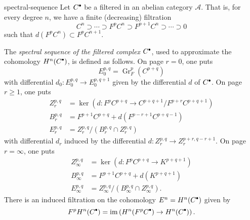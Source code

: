 \begin{example}{spectral-sequence}
    Let $C^\bdot$ be a filtered  in an abelian category $\mathcal{A}$. That is, for every degree $n$, we have a finite (decreasing) filtration
    \[ C^n \supset \cdots \supset F^p C^n \supset F^{p + 1} C^n \supset \cdots \supset 0 \]
    such that $d(F^p C^n) \subset F^p C^{n + 1}$.

    The \textit{spectral sequence of the filtered complex} $C^\bdot$, used to approximate the cohomology $H^n(C^\bdot)$, is defined as follows. On page $r = 0$, one puts
    \[ E_0^{p, q} = \operatorname{Gr}_F^p(C^{p + q}) \]
    with differential $d_0 \colon E_0^{p, q} \to E_0^{p, q + 1}$ given by the differential $d$ of $C^\bdot$. On page $r \ge 1$, one puts
    \[ \begin{aligned}
        Z_r^{p, q} &= \ker (d \colon F^p C^{p + q} \to C^{p + q + 1} / F^{p + r} C^{p + q + 1}) \\
        B_r^{p, q} &= F^{p + 1} C^{p + q} + d(F^{p - r + 1} C^{p + q - 1}) \\
        E_r^{p, q} &= Z_r^{p, q} / (B_r^{p, q} \cap Z_r^{p, q})
    \end{aligned} \]
    with differential $d_r$ induced by the differential $d \colon Z_r^{p, q} \to Z_r^{p + r, q - r + 1}$. On page $r = \infty$, one puts
    \[ \begin{aligned}
        Z_\infty^{p, q} &= \ker(d \colon F^p C^{p + q} \to K^{p + q + 1}) \\
        B_\infty^{p, q} &= F^{p + 1} C^{p + q} + d(K^{p + q + 1}) \\
        E_\infty^{p, q} &= Z_\infty^{p, q} / (B_\infty^{p, q} \cap Z_\infty^{p, q}) .
    \end{aligned} \]
    There is an induced filtration on the cohomology $E^n = H^n(C^\bdot)$ given by
    \[ F^p H^n(C^\bdot) = \im \left( H^n(F^p C^\bdot) \to H^n(C^\bdot) \right) . \]
\end{example}

